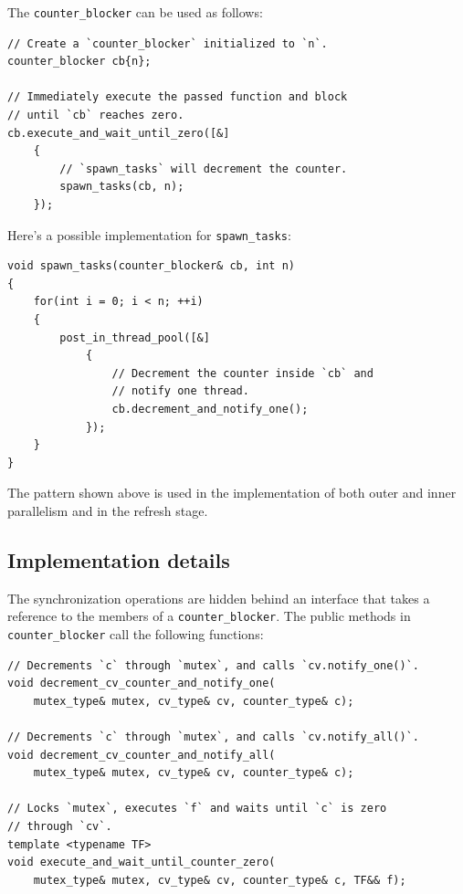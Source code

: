 \documentclass[oneside, 12pt, a4paper, openany]{book}
\begin{document}
The
\texttt{counter_blocker}
can be used as follows:

\begin{verbatim}
// Create a `counter_blocker` initialized to `n`.
counter_blocker cb{n};

// Immediately execute the passed function and block
// until `cb` reaches zero.
cb.execute_and_wait_until_zero([&]
    {
        // `spawn_tasks` will decrement the counter.
        spawn_tasks(cb, n);
    });
\end{verbatim}

Here's a possible implementation for
\texttt{spawn_tasks}:

\begin{verbatim}
void spawn_tasks(counter_blocker& cb, int n)
{
    for(int i = 0; i < n; ++i)
    {
        post_in_thread_pool([&]
            {
                // Decrement the counter inside `cb` and
                // notify one thread.
                cb.decrement_and_notify_one();
            });
    }
}
\end{verbatim}

The pattern shown above is used in the implementation of both outer and
inner parallelism and in the refresh stage.

\subsection{Implementation details}\label{implementation-details}

The synchronization operations are hidden behind an interface that takes
a reference to the members of a
\texttt{counter_blocker}.
The public methods in
\texttt{counter_blocker}
call the following functions:

\begin{verbatim}
// Decrements `c` through `mutex`, and calls `cv.notify_one()`.
void decrement_cv_counter_and_notify_one(
    mutex_type& mutex, cv_type& cv, counter_type& c);

// Decrements `c` through `mutex`, and calls `cv.notify_all()`.
void decrement_cv_counter_and_notify_all(
    mutex_type& mutex, cv_type& cv, counter_type& c);

// Locks `mutex`, executes `f` and waits until `c` is zero
// through `cv`.
template <typename TF>
void execute_and_wait_until_counter_zero(
    mutex_type& mutex, cv_type& cv, counter_type& c, TF&& f);
\end{verbatim}
\end{document}
